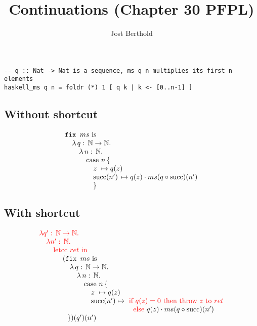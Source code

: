 \documentclass[12pt,a4paper]{article}
\author{Jost Berthold}
\title{Continuations (Chapter 30 PFPL)}
\begin{document}

\begin{verbatim}
-- q :: Nat -> Nat is a sequence, ms q n multiplies its first n elements
haskell_ms q n = foldr (*) 1 [ q k | k <- [0..n-1] ]
\end{verbatim}


\subsection*{Without shortcut}



\[
\begin{array}{l}
\mbox{\tt fix } ms \mbox{ is}\\
\quad\lambda\,q:\,\mathbb{N} \rightarrow \mathbb{N}.\\
\quad\quad\lambda\,n:\, \mathbb{N}.\\
\quad\quad\quad\mbox{case }n\,\{\\
\quad\quad\quad\quad z\,\,\mapsto q(z)\\
\quad\quad\quad\quad\mbox{succ}(n')\,\mapsto q(z) \cdot ms (q\circ \mbox{succ})(n')\\
\quad\quad\quad\quad\}
\end{array}
\]

\subsection*{With shortcut}

\newcommand{\red}[1]{\color{red}{#1}}

\[
\begin{array}{l}
\red{\lambda q':\,\mathbb{N} \rightarrow \mathbb{N} .}\\
\quad \red{\lambda n':\,\mathbb{N}.}\\
\quad\quad \red{\mbox{letcc } ret \mbox{ in}}\\
%
\quad\quad\quad\
  (\mbox{\tt fix } ms \mbox{ is}\\
\quad\quad\quad\
  \quad\lambda\,q:\,\mathbb{N} \rightarrow \mathbb{N}.\\
\quad\quad\quad\
  \quad\quad\lambda\,n:\, \mathbb{N}.\\
\quad\quad\quad\
  \quad\quad\quad\mbox{case }n\,\{\\
\quad\quad\quad\
  \quad\quad\quad\quad z\,\,\mapsto q(z)\\
\quad\quad\quad\
  \quad\quad\quad\quad\mbox{succ}(n')
  \mapsto \red{\mbox{ if } q(z)=0\mbox{ then throw } z\mbox{ to }ret}\\
\quad\quad\quad\
  \quad\quad\quad\quad\quad\quad\quad\quad\quad\quad\mbox{\red{else }}
  q(z) \cdot ms (q\circ \mbox{succ})(n')\\
\quad\quad\quad\quad\})(q')(n')
\end{array}
\]
\end{document}
